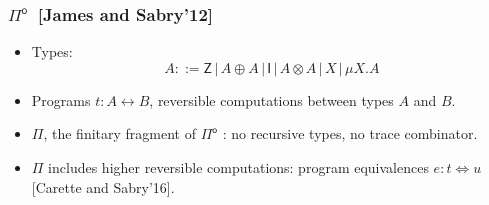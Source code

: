 \documentclass[12pt,t]{beamer}
\newcommand{\Pio}{\ensuremath{\mathsf{\Pi}^{\mathsf{o}}}}
\newcommand{\id}{\mathsf{id}}
\newcommand{\lr}{\longleftrightarrow}
\newcommand{\trace}{\ensuremath{\mathsf{trace}}}
\newcommand{\Z}{\mathsf{Z}}
\newcommand{\I}{\mathsf{I}}
\newcommand{\LR}{\iff}
\renewcommand{\dagger}{\mathsf{dagger}}
\begin{document}
\begin{frame}

  \frametitle{\Pio\ [James and Sabry'12]}

  \begin{itemize}

  \item Types:
    \[
    A ::= \Z \, | \,A \oplus A \, | \,\I \,| \,A \otimes A \,| \,X \,|
    \,\mu X.A
    \]
  \item Programs $t : A \lr B$, reversible computations between types $A$
    and $B$.
    \pause
    \vspace{\fill}
  \item $\Pi$, the finitary fragment of $\Pio$ : no recursive types,
    no trace combinator.

  \item $\Pi$ includes higher reversible computations: program
    equivalences $e : t \LR u$ [Carette and Sabry'16].

    
  \end{itemize}
  
\end{frame}
\end{document}
